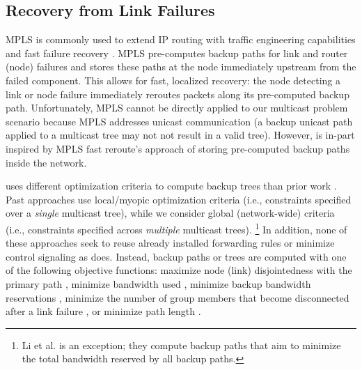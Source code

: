 \subsection{Recovery from Link Failures}
\label{subsec:related-recovery}


MPLS is commonly used to extend IP routing with traffic engineering capabilities and fast failure recovery \cite{Rosen01}.  
MPLS pre-computes backup paths for link and router (node) failures and stores these paths at the node immediately upstream from the failed component. 
This allows for fast, localized recovery: the node detecting a link or node failure immediately reroutes packets along its pre-computed backup path.  
Unfortunately, MPLS cannot be directly applied to our multicast problem scenario because MPLS addresses unicast communication (a backup unicast path applied to a multicast tree may not
not result in a valid tree).
However, \pre is in-part inspired by MPLS fast reroute's approach of storing pre-computed backup paths inside the network.



\mc uses different optimization criteria to compute backup trees than prior work \cite{Cui04,Fei01,Kodialam02,Lau05,Li06,Luebben09,Medard99,Pointurier02,Wu97}.
Past approaches use local/myopic optimization criteria (i.e., constraints specified over a \emph{single} multicast tree),
while we consider global (network-wide) criteria (i.e., constraints specified across \emph{multiple} multicast trees).  
\footnote{Li et al. \cite{Li06} is an exception; they compute backup paths that aim to minimize the total bandwidth reserved by all backup paths.}
In addition, none of these approaches seek to reuse already installed forwarding rules or minimize control signaling as \mc does.
Instead, backup paths or trees are computed with one of the following objective functions: maximize node (link) disjointedness with the primary 
path \cite{Cui04,Fei01,Luebben09,Medard99}, minimize bandwidth used \cite{Wu97}, minimize backup bandwidth reservations \cite{Kodialam02,Lau05,Li06}, minimize the number of group
members that become disconnected after a link failure \cite{Pointurier02}, or minimize path length \cite{Tian05}.


